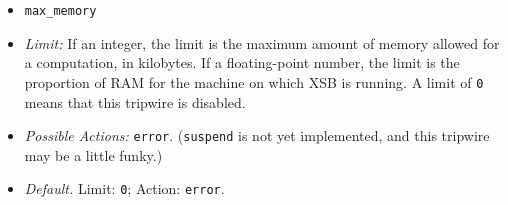 \begin{itemize}
\item {\tt max\_memory}
\bi  
\item {\em Limit:} If an integer, the limit is the maximum
 amount of memory allowed for a computation, in kilobytes.  If a
 floating-point number, the limit is the proportion of RAM for the
 machine on which XSB is running.  A limit of {\tt 0} means that
 this tripwire is disabled.
\item{\em Possible Actions:} {\tt error}. ({\tt suspend} is not yet
 implemented, and this tripwire may be a little funky.)
\item {\em Default.} Limit: {\tt 0}; Action: {\tt error}.
\ei

\end{itemize}

